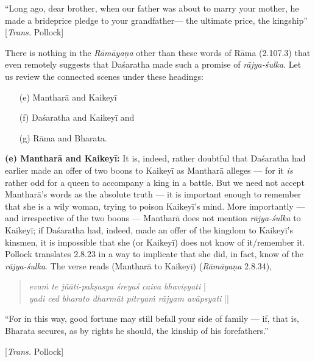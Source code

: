 \begin{myquote}
“Long ago, dear brother, when our father was about to marry your mother, he made a brideprice pledge to your grandfather--- the ultimate price, the kingship” [{\sl Trans.} Pollock]
\end{myquote}

There is nothing in the {\sl Rāmāyaṇa} other than these words of Rāma (2.107.3) that even remotely suggests that Daśaratha made such a promise of {\sl rājya-śulka}. Let us review the connected scenes under these headings: 
\begin{itemize}
\itemsep=0pt
\item[(e)] Mantharā and Kaikeyī 
\item[(f)] Daśaratha and Kaikeyī and 
\item[(g)] Rāma and Bharata.
\end{itemize}

\noindent
\textbf{(e) Mantharā and Kaikeyī:} It is, indeed, rather doubtful that Daśaratha had earlier made an offer of two boons to Kaikeyī as Mantharā alleges --- for it {\sl is} rather odd for a queen to accompany a king in a battle. But we need not accept Mantharā’s words as the absolute truth --- it is important enough to remember that she is a wily woman, trying to poison Kaikeyī’s mind.  More importantly --- and irrespective of the two boons --- Mantharā does not mention {\sl rājya-śulka} to Kaikeyī; if Daśaratha had, indeed, made an offer of the kingdom to Kaikeyī’s kinsmen, it is impossible that she (or Kaikeyī) does not know of it/remember it. Pollock translates 2.8.23 in a way to implicate that she did, in fact, know of the {\sl rājya-śulka}. The verse reads (Mantharā to Kaikeyī) ({\sl Rāmāyaṇa} 2.8.34), 
\begin{quote}
{{\sl evaṁ te jñāti-pakṣasya śreyaś caiva bhaviṣyati}} |\\
{\sl yadi ced bharato dharmāt pitryaṁ rājyam avāpsyati} || 
\end{quote}

\begin{myquote}
 “For in this way, good fortune may still befall your side of family --- if, that is, Bharata secures, as by rights he should, the kinship of his forefathers.” 

\hfill [{\sl Trans.} Pollock]
\end{myquote}

